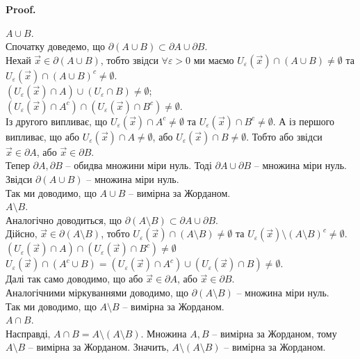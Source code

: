 \documentclass[a4paper, 10pt]{article}
\makeatletter
\def\qed{$\blacksquare$}
\theoremstyle{theoremdd}
\theoremstyle{theoremdd}
\theoremstyle{theoremdd}
\theoremstyle{theoremdd}
\theoremstyle{theoremdd}
\theoremstyle{theoremdd}
\theoremstyle{theoremdd}
\theoremstyle{theoremdd}
\theoremstyle{theoremdd}
\theoremstyle{theoremdd}
\theoremstyle{theoremdd}
\theoremstyle{theoremdd}
\theoremstyle{theoremdd}
\theoremstyle{theoremdd}
\theoremstyle{theoremdd}
\renewenvironment{proof}[1][Proof.\\]{\par
\pushQED{\hfill \qed}%
\normalfont \topsep6\p@\@plus6\p@\relax
\trivlist
\item\relax
{\bfseries
#1\@addpunct{.}}\hspace\labelsep\ignorespaces
}{%
\popQED\endtrivlist\@endpefalse
}
\makeatother
\begin{document}
\begin{proof}
$A \cup B$.\\
Спочатку доведемо, що $\partial (A \cup B) \subset \partial A \cup \partial B$.\\
Нехай $\vec{x} \in \partial (A \cup B)$, тобто звідси $\forall \varepsilon > 0$ ми маємо $U_\varepsilon(\vec{x}) \cap (A \cup B) \neq \emptyset$ та $U_\varepsilon(\vec{x}) \cap (A \cup B)^c \neq \emptyset$.\\
$(U_\varepsilon(\vec{x}) \cap A) \cup (U_\varepsilon \cap B) \neq \emptyset$;\\
$(U_\varepsilon(\vec{x}) \cap A^c) \cap (U_\varepsilon(\vec{x}) \cap B^c) \neq \emptyset$.\\
Із другого випливає, що $U_\varepsilon(\vec{x}) \cap A^c \neq \emptyset$ та $U_\varepsilon(\vec{x}) \cap B^c \neq \emptyset$. А із першого випливає, що або $U_\varepsilon(\vec{x}) \cap A \neq \emptyset$, або $U_\varepsilon(\vec{x}) \cap B \neq \emptyset$. Тобто або звідси $\vec{x} \in \partial A$, або $\vec{x} \in \partial B$.\\
Тепер $\partial A, \partial B$ -- обидва множини міри нуль. Тоді $\partial A \cup \partial B$ -- множина міри нуль. Звідси $\partial (A \cup B)$ -- множина міри нуль.\\
Так ми доводимо, що $A \cup B$ -- вимірна за Жорданом.
\bigskip \\
$A \setminus B$.\\
Аналогічно доводиться, що $\partial(A \setminus B) \subset \partial A \cup \partial B$.\\
Дійсно, $\vec{x} \in \partial(A \setminus B)$, тобто $U_\varepsilon(\vec{x}) \cap (A \setminus B) \neq \emptyset$ та $U_\varepsilon(\vec{x}) \setminus (A \setminus B)^c \neq \emptyset$.\\
$(U_\varepsilon(\vec{x}) \cap A) \cap (U_\varepsilon(\vec{x}) \cap B^c) \neq \emptyset$\\
$U_\varepsilon(\vec{x}) \cap (A^c \cup B) = (U_\varepsilon(\vec{x}) \cap A^c) \cup (U_\varepsilon(\vec{x}) \cap B) \neq \emptyset$.\\
Далі так само доводимо, що або $\vec{x} \in \partial A$, або $\vec{x} \in \partial B$.\\
Аналогічними міркуваннями доводимо, що $\partial(A \setminus B)$ -- множина міри нуль.\\
Так ми доводимо, що $A \setminus B$ -- вимірна за Жорданом.
\bigskip \\
$A \cap B$.\\
Насправді, $A \cap B = A \setminus (A \setminus B)$. Множина $A,B$ -- вимірна за Жорданом, тому $A \setminus B$ -- вимірна за Жорданом. Значить, $A \setminus (A \setminus B)$ -- вимірна за Жорданом.
\end{proof}
\end{document}
